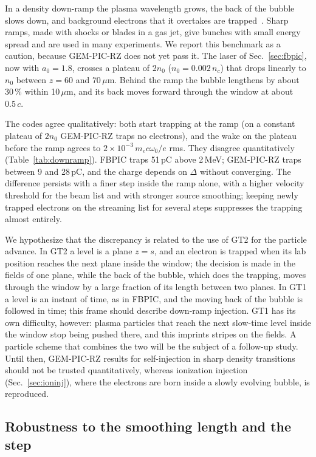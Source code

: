\documentclass[preprint,12pt]{elsarticle}
\begin{document}
In a density down-ramp the plasma wavelength grows, the back of the bubble slows down, and background electrons that it overtakes are trapped~\cite{Bulanov1998,Geddes2008,Buck2013}. Sharp ramps, made with shocks or blades in a gas jet, give bunches with small energy spread and are used in many experiments. We report this benchmark as a caution, because GEM-PIC-RZ does not yet pass it. The laser of Sec.~\ref{sec:fbpic}, now with $a_0 = 1.8$, crosses a plateau of $2n_0$ ($n_0 = 0.002\,n_c$) that drops linearly to $n_0$ between $z = 60$ and $70\,\mu$m. Behind the ramp the bubble lengthens by about 30\,\% within 10\,$\mu$m, and its back moves forward through the window at about $0.5\,c$.

The codes agree qualitatively: both start trapping at the ramp (on a constant plateau of $2n_0$ GEM-PIC-RZ traps no electrons), and the wake on the plateau before the ramp agrees to $2\times10^{-3}\,m_ec\omega_0/e$ rms. They disagree quantitatively (Table~\ref{tab:downramp}). FBPIC traps 51\,pC above 2\,MeV; GEM-PIC-RZ traps between 9 and 28\,pC, and the charge depends on $\Delta$ without converging. The difference persists with a finer step inside the ramp alone, with a higher velocity threshold for the beam list and with stronger source smoothing; keeping newly trapped electrons on the streaming list for several steps suppresses the trapping almost entirely.

We hypothesize that the discrepancy is related to the use of GT2 for the particle advance. In GT2 a level is a plane $z = s$, and an electron is trapped when its lab position reaches the next plane inside the window; the decision is made in the fields of one plane, while the back of the bubble, which does the trapping, moves through the window by a large fraction of its length between two planes. In GT1 a level is an instant of time, as in FBPIC, and the moving back of the bubble is followed in time; this frame should describe down-ramp injection. GT1 has its own difficulty, however: plasma particles that reach the next slow-time level inside the window stop being pushed there, and this imprints stripes on the fields. A particle scheme that combines the two will be the subject of a follow-up study. Until then, GEM-PIC-RZ results for self-injection in sharp density transitions should not be trusted quantitatively, whereas ionization injection (Sec.~\ref{sec:ioninj}), where the electrons are born inside a slowly evolving bubble, is reproduced.

\subsection{Robustness to the smoothing length and the step}\label{sec:sens}
\end{document}
